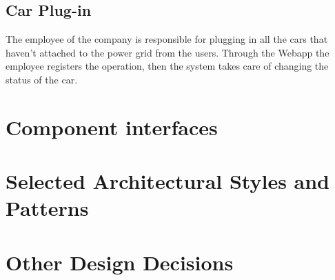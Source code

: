 \documentclass[11pt,a4paper]{report}
\begin{document}
\subsection{Car Plug-in}
The employee of the company is responsible for plugging in all the cars that haven't attached to the power grid from the users. Through the Webapp the employee registers the operation, then the system takes care of changing the status of the car.
\section{Component interfaces}
\section{Selected Architectural Styles and Patterns}
\section{Other Design Decisions}
\end{document}
